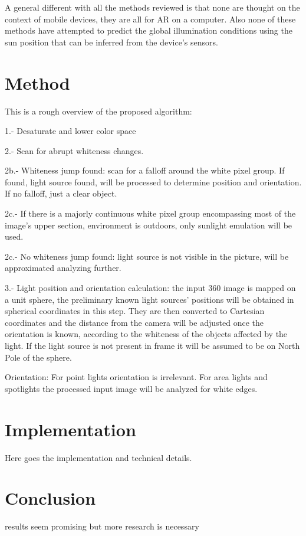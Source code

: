 \documentclass{article}
\begin{document}
A general different with all the methods reviewed is that none are thought on the context of mobile devices, they are all for AR on a computer. Also none of these methods have attempted to predict the global illumination conditions using the sun position that can be inferred from the device's sensors.

\section{Method}
This is a rough overview of the proposed algorithm:

1.- Desaturate and lower color space

2.- Scan for abrupt whiteness changes. 

2b.- Whiteness jump found: scan for a falloff around the white pixel group. If found, light source found, will be processed to determine position and orientation. If no falloff, just a clear object.

2c.- If there is a majorly continuous white pixel group encompassing most of the image's upper section, environment is outdoors, only sunlight emulation will be used.

2c.- No whiteness jump found: light source is not visible in the picture, will be approximated analyzing further.

3.- Light position and orientation calculation: the input 360 image is mapped on a unit sphere, the preliminary known light sources' positions will be obtained in spherical coordinates in this step. They are then converted to Cartesian coordinates and the distance from the camera will be adjusted once the orientation is known, according to the whiteness of the objects affected by the light. If the light source is not present in frame it will be assumed to be on North Pole of the sphere.

Orientation: For point lights orientation is irrelevant. For area lights and spotlights the processed input image will be analyzed for white edges.


\section{Implementation}
Here goes the implementation and technical details.

\section{Conclusion}
results seem promising but more research is necessary



\end{document}
